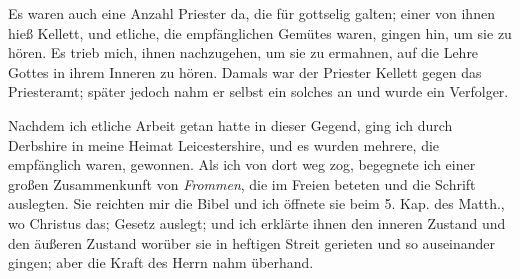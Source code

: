 Es waren auch eine Anzahl Priester da, die für gottselig
galten; einer von ihnen hieß Kellett, und etliche, die empfänglichen
Gemütes waren, gingen hin, um sie zu hören. Es trieb mich,
ihnen nachzugehen, um sie zu ermahnen, auf die Lehre Gottes in
ihrem Inneren zu hören. Damals war der Priester Kellett gegen
das Priesteramt; später jedoch nahm er selbst ein solches an und
wurde ein Verfolger.

Nachdem ich etliche Arbeit getan hatte in dieser Gegend,
ging ich durch Derbshire in meine 
Heimat Leicestershire, und
es wurden mehrere, die empfänglich waren, gewonnen. Als ich
von dort weg zog, begegnete ich einer großen Zusammenkunft
von \textit{Frommen}, die im Freien beteten und die Schrift 
auslegten. Sie reichten mir die Bibel und ich öffnete sie beim 5. Kap.
des Matth., wo Christus das; 
Gesetz auslegt; und ich erklärte
ihnen den inneren Zustand und den äußeren Zustand worüber sie
in heftigen Streit gerieten und so auseinander gingen; aber die
Kraft des Herrn  nahm überhand.

